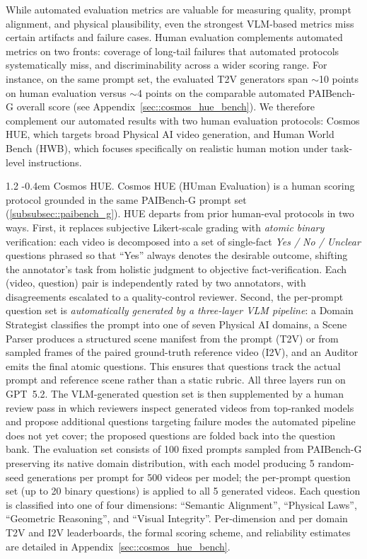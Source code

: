 \documentclass{llmxive}
\makeatletter
\providecommand{\paragraph}{  \@startsection{paragraph}{4}{\z@}    {1\baselineskip \@plus .2\baselineskip}    {-0.4em}    {\normalfont\normalsize\bfseries}}
\makeatother
\begin{document}
While automated evaluation metrics are valuable for measuring quality, prompt alignment, and physical plausibility, even the strongest VLM-based metrics miss certain artifacts and failure cases. Human evaluation complements automated metrics on two fronts: coverage of long-tail failures that automated protocols systematically miss, and discriminability across a wider scoring range. For instance, on the same prompt set, the evaluated T2V generators span $\sim$10 points on human evaluation versus $\sim$4 points on the comparable automated PAIBench-G overall score (see Appendix~\ref{sec::cosmos_hue_bench}). We therefore complement our automated results with two human evaluation protocols: Cosmos HUE, which targets broad Physical AI video generation, and Human World Bench (HWB), which focuses specifically on realistic human motion under task-level instructions.

\paragraph{Cosmos HUE.} Cosmos HUE (HUman Evaluation) is a human scoring protocol grounded in the same PAIBench-G prompt set (\cref{subsubsec::paibench_g}). HUE departs from prior
human-eval protocols in two ways. First, it replaces subjective Likert-scale grading with \emph{atomic binary} verification: each video is decomposed into a set of single-fact \emph{Yes / No / Unclear} questions phrased so that ``Yes'' always denotes the desirable outcome, shifting the annotator's task from holistic judgment to objective fact-verification. Each (video, question) pair is independently rated by two annotators, with disagreements escalated to a quality-control reviewer.   Second, the per-prompt question set is \emph{automatically generated by a three-layer VLM pipeline}: a Domain Strategist classifies the prompt into one of seven Physical AI domains, a Scene Parser produces a structured scene manifest from the prompt (T2V) or from sampled frames of the paired ground-truth reference video (I2V), and an Auditor emits the final atomic questions. This ensures that questions track the actual prompt and reference scene rather than a static rubric. All three layers run on GPT~5.2. The VLM-generated question set is then supplemented by a human review pass in which reviewers inspect generated videos from top-ranked models and propose additional questions targeting failure modes the automated pipeline does not yet cover; the proposed questions are folded back into the question bank. The evaluation set consists of 100 fixed prompts sampled from PAIBench-G preserving its native domain distribution, with each model producing 5 random-seed generations per prompt for 500 videos per model; the per-prompt question set (up to 20 binary questions) is applied to all 5 generated videos. Each question is classified into one of four dimensions: ``Semantic Alignment'', ``Physical Laws'', ``Geometric Reasoning'', and ``Visual Integrity''. Per-dimension and per domain T2V and I2V leaderboards, the formal scoring scheme, and reliability estimates are detailed in Appendix~\ref{sec::cosmos_hue_bench}.
\end{document}
